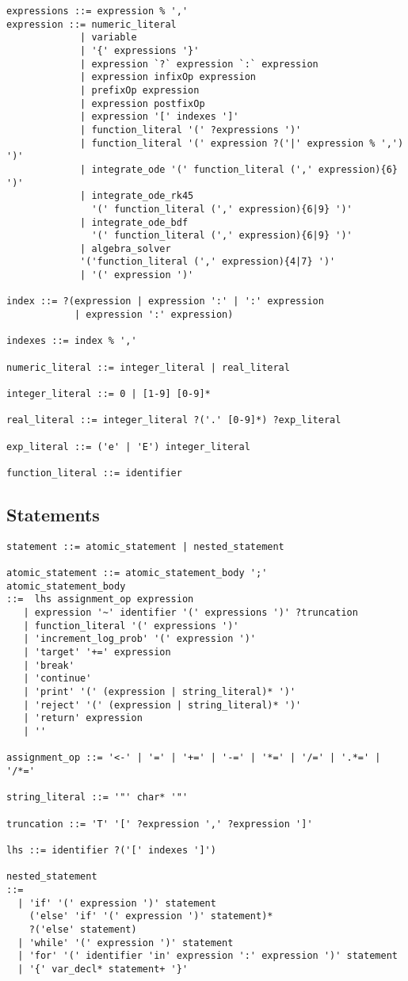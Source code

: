 {
\small
\begin{Verbatim}[fontsize=\small]
expressions ::= expression % ','
expression ::= numeric_literal
             | variable
             | '{' expressions '}'
             | expression `?` expression `:` expression
             | expression infixOp expression
             | prefixOp expression
             | expression postfixOp
             | expression '[' indexes ']'
             | function_literal '(' ?expressions ')'
             | function_literal '(' expression ?('|' expression % ',') ')'
             | integrate_ode '(' function_literal (',' expression){6} ')'
             | integrate_ode_rk45
               '(' function_literal (',' expression){6|9} ')'
             | integrate_ode_bdf
               '(' function_literal (',' expression){6|9} ')'
             | algebra_solver
             '('function_literal (',' expression){4|7} ')'
             | '(' expression ')'

index ::= ?(expression | expression ':' | ':' expression
            | expression ':' expression)

indexes ::= index % ','

numeric_literal ::= integer_literal | real_literal

integer_literal ::= 0 | [1-9] [0-9]*

real_literal ::= integer_literal ?('.' [0-9]*) ?exp_literal

exp_literal ::= ('e' | 'E') integer_literal

function_literal ::= identifier
\end{Verbatim}
}

\subsection{Statements}

{
\small
\begin{Verbatim}[fontsize=\small]
statement ::= atomic_statement | nested_statement

atomic_statement ::= atomic_statement_body ';'
atomic_statement_body
::=  lhs assignment_op expression
   | expression '~' identifier '(' expressions ')' ?truncation
   | function_literal '(' expressions ')'
   | 'increment_log_prob' '(' expression ')'
   | 'target' '+=' expression
   | 'break'
   | 'continue'
   | 'print' '(' (expression | string_literal)* ')'
   | 'reject' '(' (expression | string_literal)* ')'
   | 'return' expression
   | ''

assignment_op ::= '<-' | '=' | '+=' | '-=' | '*=' | '/=' | '.*=' | '/*='

string_literal ::= '"' char* '"'

truncation ::= 'T' '[' ?expression ',' ?expression ']'

lhs ::= identifier ?('[' indexes ']')

nested_statement
::=
  | 'if' '(' expression ')' statement
    ('else' 'if' '(' expression ')' statement)*
    ?('else' statement)
  | 'while' '(' expression ')' statement
  | 'for' '(' identifier 'in' expression ':' expression ')' statement
  | '{' var_decl* statement+ '}'
\end{Verbatim}
%
}

